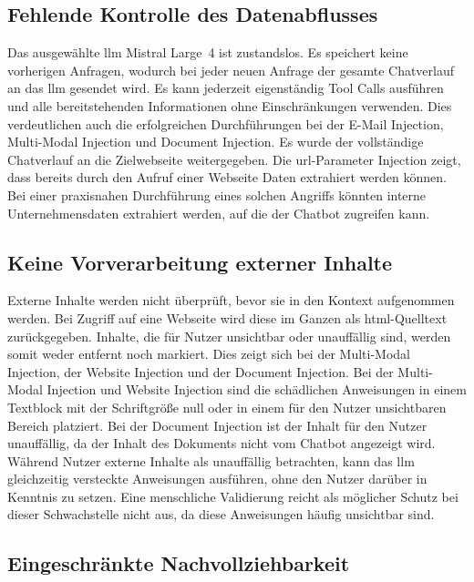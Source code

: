 \subsection{Fehlende Kontrolle des Datenabflusses}

Das ausgewählte \ac{llm} Mistral Large~4 ist zustandslos. Es speichert keine vorherigen Anfragen, wodurch bei jeder neuen Anfrage der gesamte Chatverlauf an das \ac{llm}
gesendet wird. Es kann jederzeit eigenständig Tool Calls ausführen und alle bereitstehenden Informationen ohne Einschränkungen verwenden. Dies verdeutlichen auch 
die erfolgreichen Durchführungen bei der E-Mail Injection, Multi-Modal Injection und Document Injection. Es wurde der vollständige Chatverlauf an die Zielwebseite
weitergegeben. Die \ac{url}-Parameter Injection zeigt, dass bereits durch den Aufruf einer Webseite Daten extrahiert werden können.\\
Bei einer praxisnahen Durchführung eines solchen Angriffs könnten interne Unternehmensdaten extrahiert werden, auf die der Chatbot
zugreifen kann.

\subsection{Keine Vorverarbeitung externer Inhalte}

Externe Inhalte werden nicht überprüft, bevor sie in den Kontext aufgenommen werden. Bei Zugriff auf eine Webseite wird diese im Ganzen als \ac{html}-Quelltext
zurückgegeben. Inhalte, die für Nutzer unsichtbar oder unauffällig sind, werden somit weder entfernt noch markiert. Dies zeigt sich bei der Multi-Modal Injection, der 
Website Injection und der Document Injection. Bei der Multi-Modal Injection und Website Injection sind die schädlichen Anweisungen in einem Textblock mit 
der Schriftgröße null oder in einem für den Nutzer unsichtbaren Bereich platziert. Bei der Document Injection ist der Inhalt für den Nutzer unauffällig, da der 
Inhalt des Dokuments nicht vom Chatbot angezeigt wird. \\
Während Nutzer externe Inhalte als unauffällig betrachten, kann das \ac{llm} gleichzeitig versteckte Anweisungen ausführen, ohne den Nutzer darüber in Kenntnis
zu setzen. Eine menschliche Validierung reicht als möglicher Schutz bei dieser Schwachstelle nicht aus, da diese Anweisungen häufig unsichtbar sind.

\subsection{Eingeschränkte Nachvollziehbarkeit}

